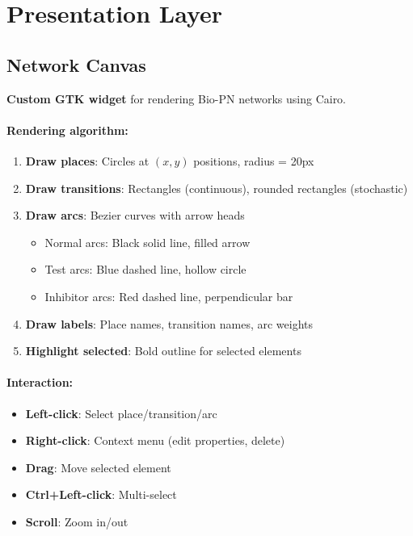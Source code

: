 \section{Presentation Layer}
\label{sec:presentation-layer}

\subsection{Network Canvas}
\label{subsec:network-canvas}

\textbf{Custom GTK widget} for rendering Bio-PN networks using Cairo.

\paragraph{Rendering algorithm:}

\begin{enumerate}
    \item \textbf{Draw places}: Circles at $(x, y)$ positions, radius = 20px
    \item \textbf{Draw transitions}: Rectangles (continuous), rounded rectangles (stochastic)
    \item \textbf{Draw arcs}: Bezier curves with arrow heads
    \begin{itemize}
        \item Normal arcs: Black solid line, filled arrow
        \item Test arcs: Blue dashed line, hollow circle
        \item Inhibitor arcs: Red dashed line, perpendicular bar
    \end{itemize}
    \item \textbf{Draw labels}: Place names, transition names, arc weights
    \item \textbf{Highlight selected}: Bold outline for selected elements
\end{enumerate}

\paragraph{Interaction:}

\begin{itemize}
    \item \textbf{Left-click}: Select place/transition/arc
    \item \textbf{Right-click}: Context menu (edit properties, delete)
    \item \textbf{Drag}: Move selected element
    \item \textbf{Ctrl+Left-click}: Multi-select
    \item \textbf{Scroll}: Zoom in/out
\end{itemize}

